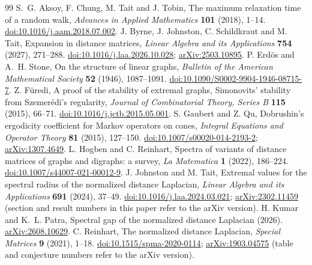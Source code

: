 \documentclass[11pt,a4paper]{article}
\theoremstyle{definition}
\begin{document}
\begin{thebibliography}{99}
\small\setlength{\itemsep}{2pt}
 S.~G. Aksoy, F. Chung, M. Tait and J. Tobin, The maximum relaxation time of a random walk, \emph{Advances in Applied Mathematics} \textbf{101} (2018), 1--14. \href{https://doi.org/10.1016/j.aam.2018.07.002}{doi:10.1016/j.aam.2018.07.002}.
 J. Byrne, J. Johnston, C. Schildkraut and M. Tait, Expansion in distance matrices, \emph{Linear Algebra and its Applications} \textbf{754} (2027), 271--288. \href{https://doi.org/10.1016/j.laa.2026.10.028}{doi:10.1016/j.laa.2026.10.028}; \href{https://arxiv.org/abs/2503.10895}{arXiv:2503.10895}.
 P. Erd\"os and A.~H. Stone, On the structure of linear graphs, \emph{Bulletin of the American Mathematical Society} \textbf{52} (1946), 1087--1091. \href{https://doi.org/10.1090/S0002-9904-1946-08715-7}{doi:10.1090/S0002-9904-1946-08715-7}.
 Z. F\"uredi, A proof of the stability of extremal graphs, Simonovits' stability from Szemer\'edi's regularity, \emph{Journal of Combinatorial Theory, Series B} \textbf{115} (2015), 66--71. \href{https://doi.org/10.1016/j.jctb.2015.05.001}{doi:10.1016/j.jctb.2015.05.001}.
 S. Gaubert and Z. Qu, Dobrushin's ergodicity coefficient for Markov operators on cones, \emph{Integral Equations and Operator Theory} \textbf{81} (2015), 127--150. \href{https://doi.org/10.1007/s00020-014-2193-2}{doi:10.1007/s00020-014-2193-2}; \href{https://arxiv.org/abs/1307.4649}{arXiv:1307.4649}.
 L. Hogben and C. Reinhart, Spectra of variants of distance matrices of graphs and digraphs: a survey, \emph{La Matematica} \textbf{1} (2022), 186--224. \href{https://doi.org/10.1007/s44007-021-00012-9}{doi:10.1007/s44007-021-00012-9}.
 J. Johnston and M. Tait, Extremal values for the spectral radius of the normalized distance Laplacian, \emph{Linear Algebra and its Applications} \textbf{691} (2024), 37--49. \href{https://doi.org/10.1016/j.laa.2024.03.021}{doi:10.1016/j.laa.2024.03.021}; \href{https://arxiv.org/abs/2302.11459}{arXiv:2302.11459} (section and result numbers in this paper refer to the arXiv version).
 H. Kumar and K.~L. Patra, Spectral gap of the normalized distance Laplacian (2026). \href{https://arxiv.org/abs/2608.10629}{arXiv:2608.10629}.
 C. Reinhart, The normalized distance Laplacian, \emph{Special Matrices} \textbf{9} (2021), 1--18. \href{https://doi.org/10.1515/spma-2020-0114}{doi:10.1515/spma-2020-0114}; \href{https://arxiv.org/abs/1903.04575}{arXiv:1903.04575} (table and conjecture numbers refer to the arXiv version).
\end{thebibliography}
\end{document}
